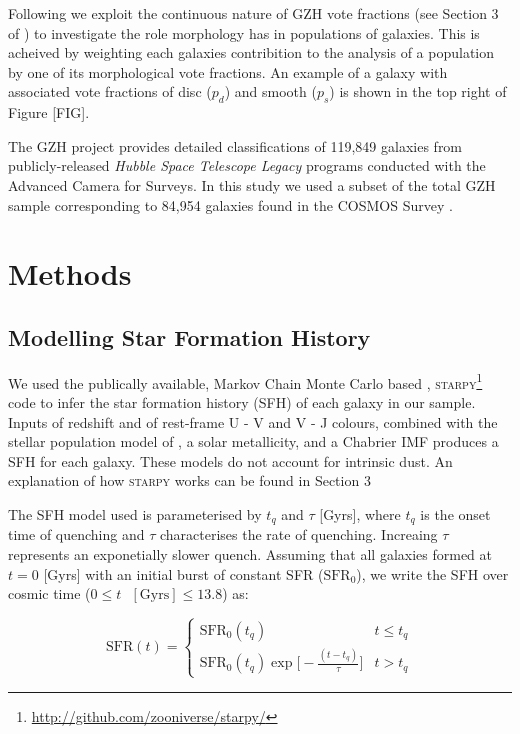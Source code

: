 \documentclass[a4paper,fleqn,usenatbib]{mnras}
\begin{document}
   Following \cite{smethurst2015galaxy} we exploit the continuous nature of GZH vote fractions (see Section 3 of
   \cite{galaxyzooHubble}) to investigate the role morphology has in populations of galaxies. This is acheived by weighting
   each galaxies contribition to the analysis of a population by one of its morphological vote fractions. An example of a galaxy
   with associated vote fractions of disc ($p_{d}$) and smooth ($p_{s}$) is shown in the top right of Figure [FIG].

   The GZH project provides detailed classifications of 119,849 galaxies from publicly-released \textit{Hubble
   Space Telescope Legacy} programs conducted with the Advanced Camera for Surveys. In this study we used a subset of the total GZH sample corresponding to 84,954
   galaxies found in the COSMOS Survey \citep{scoville2007,koekemoer2007}.

\section{Methods}   

   \subsection{Modelling Star Formation History}

   We used the publically available, Markov Chain Monte Carlo based \citep{mackey2013},
   \textsc{starpy}\footnote{\url{http://github.com/zooniverse/starpy/}} code to infer the star formation 
   history (SFH) of each galaxy in our sample. Inputs of redshift and of rest-frame U - V and V - J colours, 
   combined with the stellar population model of \cite{bruzual2003}, a solar metallicity, and a Chabrier IMF 
   \cite{chabrier2003} produces a SFH for each galaxy. These models do not account for intrinsic dust. An 
   explanation of how \textsc{starpy} works can be found in Section 3

   The SFH model used is parameterised by $t_{q}$ and $\tau$ [Gyrs], where $t_{q}$ is the onset time of quenching
   and $\tau$ characterises the rate of quenching. Increaing $\tau$ represents an exponetially slower quench. 
   Assuming that all galaxies formed at $t=0$ [Gyrs] with an initial burst of constant SFR ($\text{SFR}_{0}$), 
   we write the SFH over cosmic time ($0\leq t \text{ }[\text{Gyrs}]\leq 13.8$) as:

 \begin{equation}
       \text{SFR}(t) = \begin{cases}
                 \text{SFR}_{0}(t_{q}) & t \leq t_{q} \\
                 \text{SFR}_{0}(t_{q})\exp\bigg[-\frac{(t-t_{q})}{\tau}\bigg] & t > t_{q} 
                \end{cases}
        \label{eq:model}
 \end{equation}
\end{document}
